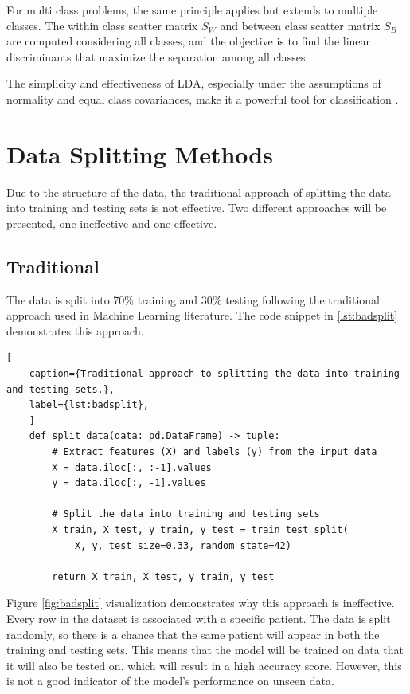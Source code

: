            For multi class problems, the same principle applies but extends to multiple classes. The within class scatter matrix $S_W$ and between class scatter matrix $S_B$ are computed considering all classes, and the objective is to find the linear discriminants that maximize the separation among all classes.  

            The simplicity and effectiveness of LDA, especially under the assumptions of normality and equal class covariances, make it a powerful tool for classification \cite{balakrishnama_linear_nodate}.

    \newpage

    \section{Data Splitting Methods}
        
            Due to the structure of the data, the traditional approach of splitting the data into training and testing sets is not effective. Two different approaches will be presented, one ineffective and one effective.

            \subsection{Traditional} \label{sec:badsplit}
                        
                    The data is split into 70\% training and 30\% testing following the traditional approach used in Machine Learning literature. The code snippet in \ref{lst:badsplit} demonstrates this approach. 
            
\begin{lstlisting}[
    caption={Traditional approach to splitting the data into training and testing sets.}, 
    label={lst:badsplit},
    ]            
    def split_data(data: pd.DataFrame) -> tuple:        
        # Extract features (X) and labels (y) from the input data
        X = data.iloc[:, :-1].values
        y = data.iloc[:, -1].values
        
        # Split the data into training and testing sets
        X_train, X_test, y_train, y_test = train_test_split(
            X, y, test_size=0.33, random_state=42)
        
        return X_train, X_test, y_train, y_test
\end{lstlisting}
                
                    Figure \ref{fig:badsplit} visualization demonstrates why this approach is ineffective. Every row in the dataset is associated with a specific patient. The data is split randomly, so there is a chance that the same patient will appear in both the training and testing sets. This means that the model will be trained on data that it will also be tested on, which will result in a high accuracy score. However, this is not a good indicator of the model's performance on unseen data.

